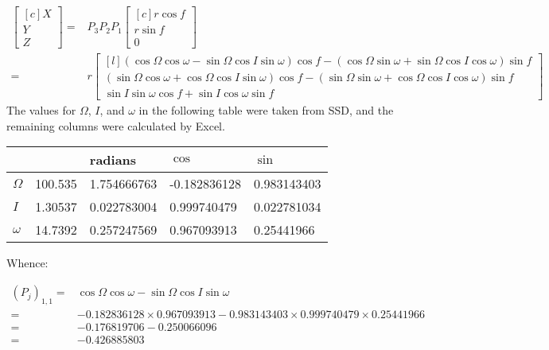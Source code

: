 \documentclass[]{article}
\begin{document}
\begin{align*}
\begin{bmatrix*}[c]
X\\
Y\\
Z
\end{bmatrix*}
=&P_3 P_2 P_1\begin{bmatrix*}[c]
r \cos f\\
r \sin f\\
0
\end{bmatrix*}\\
=&r \begin{bmatrix*}[l]
(\cos \Omega \cos \omega - \sin \Omega \cos I \sin \omega) \cos f -(\cos \Omega \sin \omega + \sin \Omega \cos I \cos \omega) \sin f\\
(\sin \Omega \cos \omega + \cos \Omega \cos I \sin \omega) \cos f - (\sin \Omega \sin \omega + \cos \Omega \cos I \cos \omega) \sin f\\
\sin I \sin \omega \cos f + \sin I \cos \omega \sin f
\end{bmatrix*}
\end{align*}
The values for $\Omega$, $I$, and $\omega$ in the following table were taken from SSD, and the remaining columns were calculated by Excel.
\begin{center}
	\begin{tabular}{|l|l|l|l|l|}
		\hline
		&&	radians&$\cos$&$\sin$\\ \hline
		$\Omega$&100.535\degree	&1.754666763&	-0.182836128&	0.983143403\\ \hline
		$I$&1.30537\degree&	0.022783004&	0.999740479&	0.022781034\\ \hline
		$\omega$&14.7392\degree&	0.257247569&	0.967093913&	0.25441966\\ \hline
	\end{tabular}
\end{center}

Whence:

\begin{align*}
(P_j)_{1,1} =& \cos \Omega \cos \omega - \sin \Omega \cos I \sin \omega \\
=& -0.182836128 \times 	0.967093913 - 0.983143403 \times 0.999740479 \times 	0.25441966\\
=& -0.176819706 - 0.250066096\\
=& -0.426885803
\end{align*}
\end{document}
